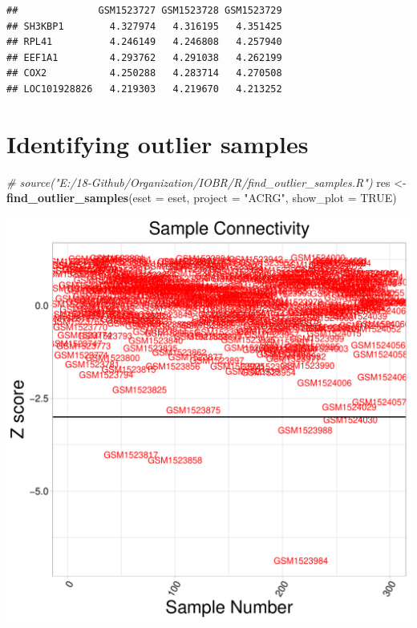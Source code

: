 \documentclass[
  12pt,
]{book}
\newenvironment{Shaded}{\begin{snugshade}}{\end{snugshade}}
\newcommand{\AttributeTok}[1]{\textcolor[rgb]{0.13,0.29,0.53}{#1}}
\newcommand{\CommentTok}[1]{\textcolor[rgb]{0.56,0.35,0.01}{\textit{#1}}}
\newcommand{\ConstantTok}[1]{\textcolor[rgb]{0.56,0.35,0.01}{#1}}
\newcommand{\FunctionTok}[1]{\textcolor[rgb]{0.13,0.29,0.53}{\textbf{#1}}}
\newcommand{\NormalTok}[1]{#1}
\newcommand{\OtherTok}[1]{\textcolor[rgb]{0.56,0.35,0.01}{#1}}
\newcommand{\StringTok}[1]{\textcolor[rgb]{0.31,0.60,0.02}{#1}}
\theoremstyle{definition}
\theoremstyle{definition}
\theoremstyle{definition}
\theoremstyle{definition}
\theoremstyle{remark}
\begin{document}
\begin{verbatim}
##              GSM1523727 GSM1523728 GSM1523729
## SH3KBP1        4.327974   4.316195   4.351425
## RPL41          4.246149   4.246808   4.257940
## EEF1A1         4.293762   4.291038   4.262199
## COX2           4.250288   4.283714   4.270508
## LOC101928826   4.219303   4.219670   4.213252
\end{verbatim}

\hypertarget{identifying-outlier-samples}{%
\section{Identifying outlier samples}\label{identifying-outlier-samples}}

\begin{Shaded}
\begin{Highlighting}[]
\CommentTok{\# source("E:/18{-}Github/Organization/IOBR/R/find\_outlier\_samples.R")}
\NormalTok{res }\OtherTok{\textless{}{-}} \FunctionTok{find\_outlier\_samples}\NormalTok{(}\AttributeTok{eset =}\NormalTok{ eset, }\AttributeTok{project =} \StringTok{"ACRG"}\NormalTok{, }\AttributeTok{show\_plot =} \ConstantTok{TRUE}\NormalTok{)}
\end{Highlighting}
\end{Shaded}

\begin{center}\includegraphics{_main_files/figure-latex/unnamed-chunk-8-1} \end{center}
\end{document}
